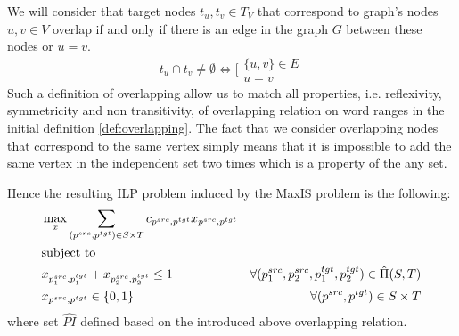 We will consider that target nodes \( t_u, t_v \in T_{V} \) that correspond to graph's nodes \( u, v \in V \) overlap
if and only if there is an edge in the graph \( G \) between these nodes or \( u = v \).
\begin{equation} \label{eq:overlap_reduction}
    t_u \cap t_v \neq \emptyset \Leftrightarrow
    \Biggl[
    \begin{array}{l}
        \{ u, v \} \in E \\
        u = v
    \end{array}
\end{equation}
Such a definition of overlapping allow us to match all properties, i.e. reflexivity, symmetricity and non transitivity,
of overlapping relation on word ranges in the initial definition \ref{def:overlapping}. The fact that we consider
overlapping nodes that correspond to the same vertex simply means that it is impossible to
add the same vertex in the independent set two times which is a property of the any set.

Hence the resulting ILP problem induced by the MaxIS problem is the following:
\begin{equation} \label{eq:reduction_without_nproj}
    \begin{aligned}
         & \max\limits_x \sum\limits_{(p^{src}, p^{tgt}) \in S \times T} c_{p^{src}, p^{tgt}} x_{p^{src}, p^{tgt}}                                             \\
         & \text{subject to}                                                                                                                                   \\
         & x_{p_1^{src}, p_1^{tgt}} + x_{p_2^{src}, p_2^{tgt}} \leq 1
         & \forall (p_1^{src}, p_2^{src}, p_1^{tgt}, p_2^{tgt}) \in \hat{\Pi}(S, T)                                                                            \\
         & x_{p^{src}, p^{tgt}} \in \{ 0, 1 \}                                                                     & \forall (p^{src}, p^{tgt}) \in S \times T
    \end{aligned}
\end{equation}
where set \( \hat{PI} \) defined based on the introduced above overlapping relation.

